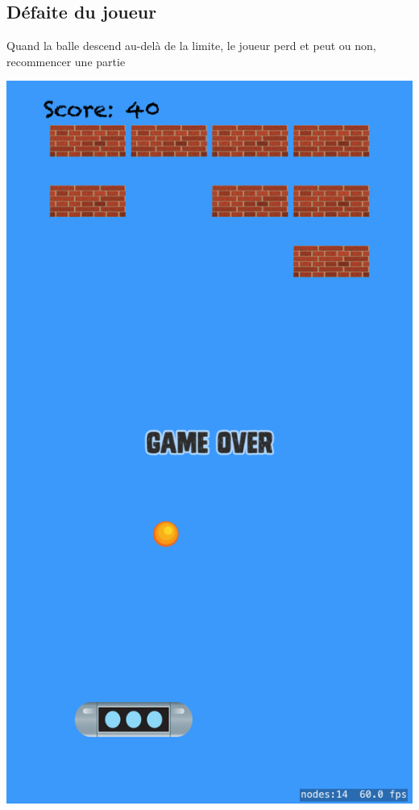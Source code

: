 \documentclass[a4paper]{article}
\begin{document}
\subsection{Défaite du joueur}
Quand la balle descend au-delà de la limite, le joueur perd et peut ou non, recommencer une partie
\begin{center}
  \includegraphics[scale=0.11]{images/iOS3.png}
\end{center}

\newpage
\end{document}
